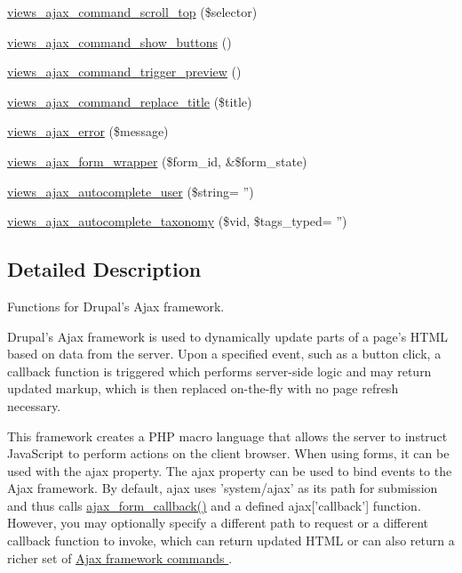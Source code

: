 \begin{DoxyCompactItemize}
\item 
\hyperlink{group__ajax_gac7d8055fd4e9c91501496391dbe94b5a}{views\_\-ajax\_\-command\_\-scroll\_\-top} (\$selector)
\item 
\hyperlink{group__ajax_ga3ef672bfe39df163a3cf89ed23c8a0c2}{views\_\-ajax\_\-command\_\-show\_\-buttons} ()
\item 
\hyperlink{group__ajax_ga698e1518b153b16adbe61e3aeb376eac}{views\_\-ajax\_\-command\_\-trigger\_\-preview} ()
\item 
\hyperlink{group__ajax_ga42db219284fd40096900731ee6d13600}{views\_\-ajax\_\-command\_\-replace\_\-title} (\$title)
\item 
\hyperlink{group__ajax_ga59f31023b894be21852b7034f639523f}{views\_\-ajax\_\-error} (\$message)
\item 
\hyperlink{group__ajax_ga7eed0d665d7b4c8c8134eb060afbb2be}{views\_\-ajax\_\-form\_\-wrapper} (\$form\_\-id, \&\$form\_\-state)
\item 
\hyperlink{group__ajax_ga0d9404f1a04f9f5102ffac0bef92d5ab}{views\_\-ajax\_\-autocomplete\_\-user} (\$string= '')
\item 
\hyperlink{group__ajax_ga4aed960e2ee6b6e516e609188852c0f6}{views\_\-ajax\_\-autocomplete\_\-taxonomy} (\$vid, \$tags\_\-typed= '')
\end{DoxyCompactItemize}


\subsection{Detailed Description}
Functions for Drupal's Ajax framework.

Drupal's Ajax framework is used to dynamically update parts of a page's HTML based on data from the server. Upon a specified event, such as a button click, a callback function is triggered which performs server-\/side logic and may return updated markup, which is then replaced on-\/the-\/fly with no page refresh necessary.

This framework creates a PHP macro language that allows the server to instruct JavaScript to perform actions on the client browser. When using forms, it can be used with the ajax property. The ajax property can be used to bind events to the Ajax framework. By default, ajax uses 'system/ajax' as its path for submission and thus calls \hyperlink{group__ajax_gabe2739824006df057d291f6be49759ab}{ajax\_\-form\_\-callback()} and a defined ajax\mbox{[}'callback'\mbox{]} function. However, you may optionally specify a different path to request or a different callback function to invoke, which can return updated HTML or can also return a richer set of \hyperlink{group__ajax__commands}{Ajax framework commands }.

